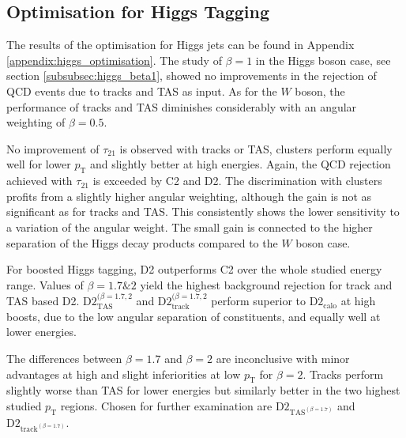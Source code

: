 \subsection{Optimisation for Higgs Tagging}
The results of the optimisation for Higgs jets can be found in Appendix \ref{appendix:higgs_optimisation}. The study of $\beta=1$ in the Higgs boson case, see section \ref{subsubsec:higgs_beta1}, showed no improvements in the rejection of QCD events due to tracks and TAS as input. As for the $W$ boson, the performance of tracks and TAS diminishes considerably with an angular weighting of $\beta=0.5$.

No improvement of $\tau_{21}$ is observed with tracks or TAS, clusters perform equally well for lower $p_{\mathrm{T}}$ and slightly better at high energies. Again, the QCD rejection achieved with $\tau_{21}$ is exceeded by C2 and D2. The discrimination with clusters profits from a slightly higher angular weighting, although the gain is not as significant as for tracks and TAS. This consistently shows the lower sensitivity to a variation of the angular weight. The small gain is connected to the higher separation of the Higgs decay products compared to the $W$ boson case.

For boosted Higgs tagging, D2 outperforms C2 over the whole studied energy range. Values of $\beta=1.7 \& 2$ yield the highest background rejection for track and TAS based D2. $\text{D2}_{\text{TAS}}^{(\beta=1.7,2}$ and $\text{D2}_{\text{track}}^{(\beta=1.7,2}$ perform superior to $\text{D2}_{\text{calo}}$ at high boosts, due to the low angular separation of constituents, and equally well at lower energies.

The differences between $\beta=1.7$ and $\beta=2$ are inconclusive with minor advantages at high and slight inferiorities at low $p_{\mathrm{T}}$ for $\beta=2$. Tracks perform slightly worse than TAS for lower energies but similarly better in the two highest studied $p_{\mathrm{T}}$ regions. Chosen for further examination are $\text{D2}_{\text{TAS}^{(\beta=1.7)}}$ and $\text{D2}_{\text{track}^{(\beta=1.7)}}$.

